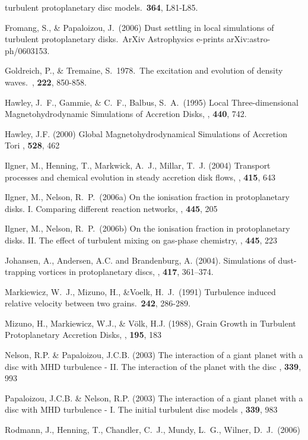 \begin{literature}
turbulent protoplanetary disc models.\ \mn \textbf{364}, L81-L85. 
% 
\item Fromang, S., \& Papaloizou, J.\ (2006) Dust settling in local simulations of turbulent 
protoplanetary disks.\ ArXiv Astrophysics e-prints arXiv:astro-ph/0603153. 
%
\item Goldreich, P., \& Tremaine, S.\ 1978.\ The excitation and evolution of density waves.\ \apj, \textbf{222}, 850-858.  
%
\item Hawley, J.~F., Gammie, \& C.~F., Balbus, S.~A.\ (1995) Local Three-dimensional Magnetohydrodynamic 
Simulations of Accretion Disks, \apj, \textbf {440}, 742. 
% 
\item Hawley, J.F. (2000)
  Global Magnetohydrodynamical Simulations of Accretion Tori
  \apj, \textbf{528}, 462
\item Ilgner, M., Henning, T., Markwick, A.~J., Millar, T.~J. (2004)
   Transport processes and chemical evolution in steady accretion disk flows,
  \aap, \textbf{415}, 643
\item Ilgner, M., Nelson, R.~P.\ (2006a) On the ionisation fraction in protoplanetary disks. I. 
Comparing different reaction networks,
  \aap, \textbf{445}, 205
\item Ilgner, M., Nelson, R.~P.\ (2006b) 
  On the ionisation fraction in protoplanetary disks. II. The 
  effect of turbulent mixing on gas-phase chemistry,
  \aap, \textbf{445}, 223
\item  Johansen, A., Andersen, A.C. and Brandenburg, A. (2004). 
 Simulations of dust-trapping vortices in protoplanetary discs, 
\aap, \textbf{417}, 361--374.   %
%
\item Markiewicz, W.~J., Mizuno, H., \&Voelk, H.~J.\ (1991) Turbulence induced relative velocity 
between two grains.\ \aap \textbf{242}, 286-289. 
% 
\item Mizuno, H., Markiewicz, W.J., \& V\"olk, H.J. (1988), 
 Grain Growth in Turbulent Protoplanetary Accretion Disks, 
  \aap,  {\bf 195}, 183  %
\item Nelson, R.P. \& Papaloizou, J.C.B. (2003) 
  The interaction of a giant planet with a disc with MHD turbulence -
   II. The interaction of the planet with the disc
  \mn, \textbf{339}, 993
\item Papaloizou, J.C.B. \& Nelson, R.P. (2003) 
  The interaction of a giant planet with a disc with MHD turbulence -
   I. The initial turbulent disc models
  \mn, \textbf{339}, 983
\item Rodmann, J., Henning, T., Chandler, C.~J., Mundy, L.~G., Wilner, D.~J.\ (2006) 

\end{literature}
